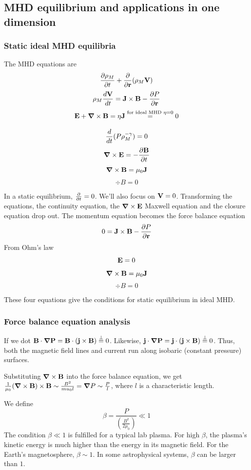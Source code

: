 \documentclass[PlasmaNotes.tex]{subfiles}
\begin{document}
\subsection{MHD equilibrium and applications in one dimension}

\subsubsection{Static ideal MHD equilibria}
The MHD equations are
\[ \frac{\partial \rho_M}{\partial t} + \frac{\partial }{\partial \mathbf{r}}(\rho_M \mathbf{V}) \]
\[ \rho_M \frac{d \mathbf{V}}{d t} = \mathbf{J} \times \mathbf{B} - \frac{\partial P}{\partial \mathbf{r}} \]
\[ \mathbf{E} + \mbox{\boldmath$ \nabla $} \times \mathbf{B} = \eta \mathbf{J} \stackrel{\text{for ideal MHD } \eta = 0}{=} 0 \]
\begin{center}
\end{center}
\[ \frac{d }{d t} (P \rho_M^{-\gamma})=0 \]
\[\mbox{\boldmath$ \nabla $} \times \mathbf{E} = -\frac{\partial \mathbf{B}}{\partial t} \]
\[ \mbox{\boldmath$ \nabla $} \times \mathbf{B} = \mu_0 \mathbf{J} \]
\[ \div{B} = 0 \]

In a static equilibrium, $\frac{\partial }{\partial t} =0$. We'll also focus on $\mathbf{V}=0$. Transforming the equations, the continuity equation, the $\mbox{\boldmath$ \nabla $} \times \mathbf{E}$ Maxwell equation and the closure equation drop out. The momentum equation becomes the force balance equation
\[ 0 = \mathbf{J} \times \mathbf{B} - \frac{\partial P}{\partial \mathbf{r}} \]
From Ohm's law
\[ \mathbf{E} = 0 \]
\[ \mbox{\boldmath$ \nabla $} \times \mathbf{B} = \mu_0 \mathbf{J} \]
\[ \div{B} = 0 \]

These four equations give the conditions for static equilibrium in ideal MHD.

\subsubsection{Force balance equation analysis}
If we dot $\mathbf{B} \cdot \mathbf{\mbox{\boldmath$ \nabla $} P} = \mathbf{B} \cdot \mathbf{(\mathbf{j} \times \mathbf{B})} \stackrel{\perp}{=} 0$. Likewise, $\mathbf{j} \cdot \mathbf{\mbox{\boldmath$ \nabla $} P} = \mathbf{j} \cdot \mathbf{(\mathbf{j} \times \mathbf{B})} \stackrel{\perp}{=} 0$. Thus, both the magnetic field lines and current run along isobaric (constant pressure) surfaces.

Substituting $\mbox{\boldmath$ \nabla $} \times \mathbf{B}$ into the force balance equation, we get
$\frac{1}{\mu_0} \mathbf{(\mbox{\boldmath$ \nabla $} \times \mathbf{B})} \times \mathbf{B} \sim \frac{B^2}{mu_0 l} = \mbox{\boldmath$ \nabla $} P \sim \frac{P}{l}$, where $l$ is a characteristic length.

We define
\begin{equation}
\boxed{\beta = \frac{P}{(\frac{B^2}{2\mu_0})} \ll 1 }
\end{equation}
The condition $\beta \ll 1$ is fulfilled for a typical lab plasma. For high $\beta$, the plasma's kinetic energy is much higher than the energy in its magnetic field. For the Earth's magnetosphere, $\beta \sim 1$. In some astrophysical systems, $\beta$ can be larger than $1$.
\end{document}
